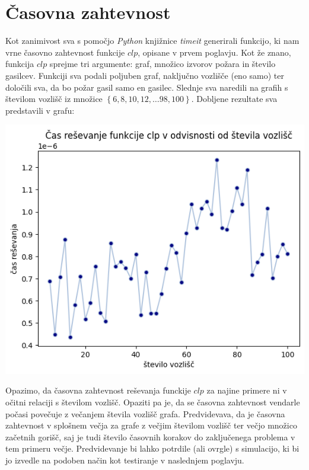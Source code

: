 \documentclass[a4paper, 12pt]{article}
\begin{document}
\pagebreak


\section{Časovna zahtevnost}
\overfullrule=0pt

Kot zanimivost sva s pomočjo \emph{Python} knjižnice \emph{timeit} generirali funkcijo, ki nam 
vrne časovno zahtevnost funkcije $clp$, opisane v prvem poglavju. 
Kot že znano, funkcija $clp$ sprejme tri argumente: graf, množico izvorov požara in
število gasilcev. Funkciji sva podali poljuben graf, naključno vozlišče (eno samo) ter
določili sva, da bo požar gasil samo en gasilec.
Slednje sva naredili na grafih s številom vozlišč iz množice $ \left\{ 6, 8, 10, 12, \ldots 98, 100 \right\} $.
Dobljene rezultate sva predstavili v grafu: \\

\begin{center}
    \includegraphics[scale=0.7]{cas}
\end{center}

\noindent Opazimo, da časovna zahtevnost reševanja funckije $clp$ za najine primere ni v očitni relaciji s
številom vozlišč.
Opaziti pa je, da se časovna zahtevnost vendarle počasi povečuje z večanjem števila vozlišč 
grafa.
Predvidevava, da je časovna zahtevnost v splošnem večja za grafe z večjim 
številom vozlišč ter večjo množico začetnih gorišč, saj je tudi število časovnih korakov do zaključenega problema v
tem primeru večje. Predvidevanje bi lahko potrdile (ali ovrgle) s simulacijo, ki bi jo izvedle
na podoben način kot testiranje v naslednjem poglavju.
\end{document}
